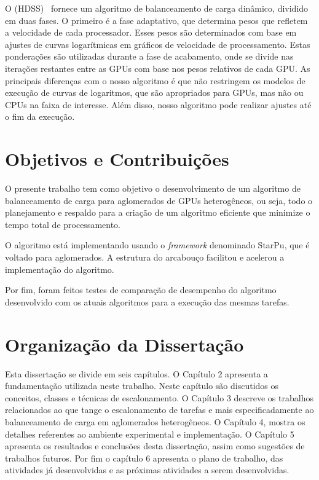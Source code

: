 O  (HDSS)~\citep{HDSS} fornece um algoritmo de balanceamento de carga dinâmico, dividido em duas fases. O primeiro é a fase adaptativo, que determina pesos que refletem a velocidade de cada processador. Esses pesos são determinados com base em ajustes de curvas logarítmicas em gráficos de velocidade de processamento. Estas ponderações são utilizadas durante a fase de acabamento, onde se divide nas iterações restantes entre as GPUs com base nos pesos relativos de cada GPU. As principais diferenças com o nosso algoritmo é que não restringem os modelos de execução de curvas de logaritmos, que são apropriados para GPUs, mas não ou CPUs na faixa de interesse. Além disso, nosso algoritmo pode realizar ajustes até o fim da execução.


\section{Objetivos e Contribuições}\label{cap1:objetivos}

O presente trabalho tem como objetivo o desenvolvimento de um algoritmo de balanceamento de carga para aglomerados de GPUs heterogêneos, ou seja, todo o planejamento e respaldo para a criação de um algoritmo eficiente que minimize o tempo total de processamento.

O algoritmo está implementando usando o \textit{framework} denominado StarPu, que é voltado para aglomerados. A estrutura do arcabouço facilitou e acelerou a implementação do algoritmo.

Por fim, foram feitos testes de comparação de desempenho do algoritmo desenvolvido com os atuais algoritmos para a execução das mesmas tarefas.


\section{Organização da Dissertação}\label{cap1:organizacao}

Esta dissertação se divide em seis capítulos. O Capítulo 2 apresenta a fundamentação utilizada neste trabalho. Neste capítulo são discutidos os conceitos, classes e técnicas de escalonamento. O Capítulo 3 descreve os trabalhos relacionados ao que tange o escalonamento de tarefas e mais especificadamente ao balanceamento de carga em aglomerados heterogêneos.
O Capítulo 4, mostra os detalhes referentes ao ambiente experimental e implementação.
O Capítulo 5 apresenta os resultados e conclusões desta dissertação, assim como sugestões de trabalhos futuros.
Por fim o capítulo 6 apresenta o plano de trabalho, das atividades já desenvolvidas e as próximas atividades a serem desenvolvidas.


